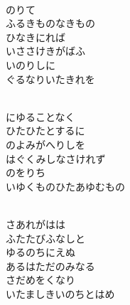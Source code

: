 \documentclass[10pt,b5j]{tarticle} %
\begin{document}
\vspace{1.5em} %
\newcommand{\linespace}{0.5em} %
\newcommand{\blocksize}{0.5\hsize} %
\newcommand{\itemmargin}{6em} %
\begin{enumerate} %
    \setlength{\itemindent}{\itemmargin} %
    \begin{minipage}[c]{\blocksize}
    
        \vspace{\linespace}
        \item~\\
        のりて\\
        ふるきものなきもの\\
        ひなきにれば\\
        いささけきがばふ\\
        いのりしに\\
        ぐるなりいたきれを
        
        \vspace{\linespace}
        \item~\\
        にゆることなく\\
        ひたひたとするに\\
        のよみがへりしを\\
        はぐくみしなさけれず\\
        のをりち\\
        いゆくものひたあゆむもの
        
        \vspace{\linespace}
        \item~\\
        さあれがはは\\
        ふたたびふなしと\\
        ゆるのちにえぬ\\
        あるはただのみなる\\
        さだめをくなり\\
        いたましきいのちとはめ
        

\end{minipage}
\end{enumerate}
\end{document}
